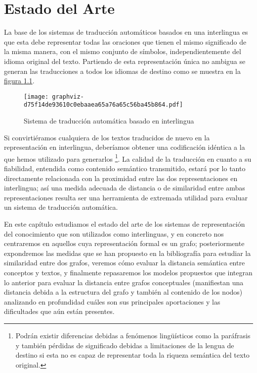 \documentclass[a4paper,12pt,spanish]{book}
\begin{document}
\chapter{Estado del Arte}
\label{1.state-of-the-art/index:estado-del-arte}\label{1.state-of-the-art/index::doc}
La base de los sistemas de traducción automáticos basados en una interlingua es
que esta debe representar todas las oraciones que tienen el mismo
significado de la misma manera, con el mismo conjunto de símbolos, independientemente
del idioma original del texto. Partiendo de esta representación única no ambigua
se generan las traducciones a todos los idiomas de destino como se muestra en
la \hyperref[1.state-of-the-art/index:fig-interlingua-esquema]{figura  \ref*{1.state-of-the-art/index:fig-interlingua-esquema}}.
\begin{figure}[htbp]
\centering
\capstart

\texttt{[image: graphviz-d75f14de93610c0ebaaea65a76a65c56ba45b864.pdf]}
\caption{Sistema de traducción automática basado en interlingua}\label{1.state-of-the-art/index:fig-interlingua-esquema}\end{figure}

Si convirtiéramos cualquiera de los textos traducidos de nuevo en la representación
en interlingua, deberíamos obtener una codificación idéntica a la que hemos
utilizado para generarlos \footnote{
Podrán existir diferencias debidas a fenómenos lingüísticos como la paráfrasis y
también pérdidas de significado debidas a limitaciones de la lengua de destino si esta
no es capaz de representar toda la riqueza semántica del texto original.
}. La calidad de la traducción en cuanto a su fiabilidad,
entendida como contenido semántico transmitido, estará por lo tanto directamente
relacionada con la proximidad entre las dos representaciones en interlingua; así
una medida adecuada de distancia o de similaridad entre ambas representaciones resulta
ser una herramienta de extremada utilidad para evaluar un sistema de traducción automática.

En este capítulo estudiamos el estado del arte de los sistemas de representación del
conocimiento que son utilizados como interlinguas, y en concreto nos centraremos en
aquellos cuya representación formal es un grafo; posteriormente expondremos las
medidas que se han propuesto en la bibliografía para estudiar la similaridad entre dos
grafos, veremos cómo evaluar la distancia semántica entre conceptos y textos, y
finalmente repasaremos los modelos propuestos que integran lo anterior para evaluar
la distancia entre grafos conceptuales (manifiestan una distancia debida a la estructura
del grafo y también al contenido de los nodos) analizando en profundidad cuáles son sus
principales aportaciones y las dificultades que aún están presentes.
\end{document}
